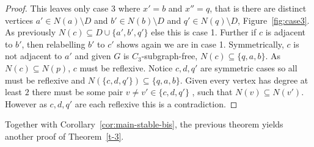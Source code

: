 \documentclass[a4paper,UKenglish,cleveref, autoref,thm-restate]{lipics-v2021}
\begin{document}
\begin{proof}
This leaves only case 3 where $x'=b$ and $x'' = q$, that is there are distinct vertices $a' \in N(a) \setminus D$ and $b' \in N(b) \setminus D$ and  $q' \in N(q) \setminus D$, Figure~\ref{fig:case3}. As previously $N(c) \subseteq D \cup \{a',b',q'\}$ else this is case 1. Further if $c$ is adjacent to $b'$, then relabelling $b'$ to $c'$ shows again we are in case 1. Symmetrically, $c$ is not adjacent to $a'$ and given $G$ is $C_3$-subgraph-free, $N(c) \subseteq \{q,a,b\}$. As $N(c) \subseteq N(p)$, $c$ must be reflexive. Notice $c,d,q'$ are symmetric cases so all must be reflexive and $N(\{c,d,q'\}) \subseteq \{q,a,b\}$. Given every vertex has degree at least $2$ there must be some pair $v \neq v' \in \{c,d,q'\}$ , such that $N(v) \subseteq N(v')$. However as $c,d,q'$ are each reflexive this is a contradiction. %
\end{proof}
Together with Corollary~\ref{cor:main-stable-bis}, the previous theorem yields another proof of Theorem~\ref{t-3}.
\end{document}
